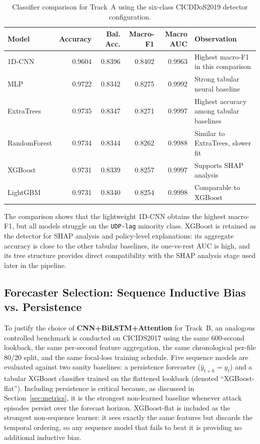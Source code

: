 \documentclass[12pt, a4paper, reqno, oneside]{book}
\begin{document}
\begin{table}[H]
\centering
\small
\caption{Classifier comparison for Track~A using the six-class
CICDDoS2019 detector configuration.}
\label{tab:classifier-comparison}
\begin{tabular}{@{}lrrrrl@{}}
\toprule
Model & Accuracy & Bal. Acc. & Macro-F1 & Macro AUC & Observation \\
\midrule
1D-CNN       & 0.9604 & 0.8396 & 0.8402 & 0.9963 & Highest macro-F1 in this comparison \\
MLP          & 0.9722 & 0.8342 & 0.8275 & 0.9992 & Strong tabular neural baseline \\
ExtraTrees   & 0.9735 & 0.8347 & 0.8271 & 0.9997 & Highest accuracy among tabular baselines \\
RandomForest & 0.9734 & 0.8344 & 0.8262 & 0.9988 & Similar to ExtraTrees, slower fit \\
XGBoost      & 0.9731 & 0.8339 & 0.8257 & 0.9997 & Supports SHAP analysis \\
LightGBM     & 0.9731 & 0.8340 & 0.8254 & 0.9998 & Comparable to XGBoost \\
\bottomrule
\end{tabular}
\end{table}

The comparison shows that the lightweight 1D-CNN obtains the highest macro-F1, but
all models struggle on the \texttt{UDP-lag} minority class. XGBoost is retained
as the detector for SHAP analysis and policy-level explanations:
its aggregate accuracy is close to the other tabular baselines, its one-vs-rest
AUC is high, and its tree structure provides direct compatibility with the SHAP
analysis stage used later in the pipeline.

\subsection{Forecaster Selection: Sequence Inductive Bias vs. Persistence}
\label{subsec:forecaster-comparison}

To justify the choice of \textbf{CNN+BiLSTM+Attention} for Track~B, an
analogous controlled benchmark is conducted on CICIDS2017 using the same 600-second
lookback, the same per-second feature aggregation, the same chronological per-file 80/20 split, and the same focal-loss training schedule. Five sequence models are evaluated against two sanity baselines: a persistence forecaster ($\hat{y}_{t+h}=y_t$) and a tabular XGBoost classifier trained on the flattened lookback (denoted ``XGBoost-flat''). Including persistence is critical because, as discussed in Section~\ref{sec:metrics}, it is the strongest non-learned baseline whenever attack episodes persist over the forecast horizon. XGBoost-flat is included as the strongest non-sequence learner: it sees exactly the same features but discards the temporal ordering, so any sequence model that fails to beat it is providing no additional inductive bias.
\end{document}

